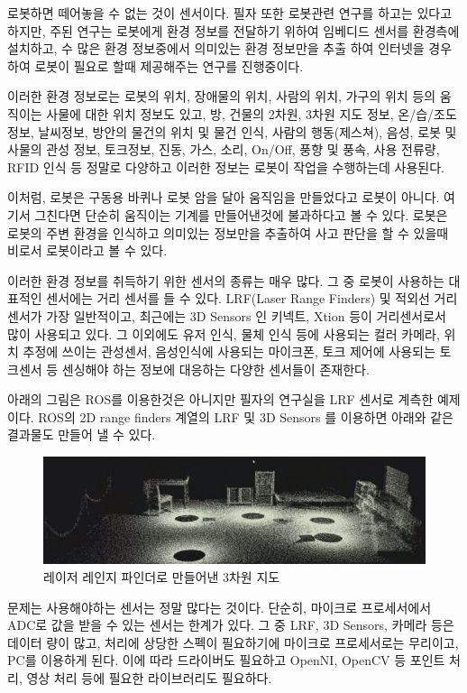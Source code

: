 로봇하면 떼어놓을 수 없는 것이 센서이다. 필자 또한 로봇관련 연구를 하고는 있다고 하지만, 주된 연구는 로봇에게 환경 정보를 전달하기 위하여 임베디드 센서를 환경측에 설치하고, 수 많은 환경 정보중에서 의미있는 환경 정보만을 추출 하여 인터넷을 경우하여 로봇이 필요로 할때 제공해주는 연구를 진행중이다. 

이러한 환경 정보로는 로봇의 위치, 장애물의 위치, 사람의 위치, 가구의 위치 등의 움직이는 사물에 대한 위치 정보도 있고, 방, 건물의 2차원, 3차원 지도 정보, 온/습/조도 정보, 날씨정보, 방안의 물건의 위치 및 물건 인식, 사람의 행동(제스쳐), 음성, 로봇 및 사물의 관성 정보, 토크정보, 진동, 가스, 소리, On/Off, 풍향 및 풍속, 사용 전류량, RFID 인식 등 정말로 다양하고 이러한 정보는 로봇이 작업을 수행하는데 사용된다.

이처럼, 로봇은 구동용 바퀴나 로봇 암을 달아 움직임을 만들었다고 로봇이 아니다. 여기서 그친다면 단순히 움직이는 기계를 만들어낸것에 불과하다고 볼 수 있다. 로봇은 로봇의 주변 환경을 인식하고 의미있는 정보만을 추출하여 사고 판단을 할 수 있을때 비로서 로봇이라고 볼 수 있다. 

이러한 환경 정보를 취득하기 위한 센서의 종류는 매우 많다. 그 중 로봇이 사용하는 대표적인 센서에는 거리 센서를 들 수 있다. LRF(Laser Range Finders) 및 적외선 거리센서가 가장 일반적이고, 최근에는 3D Sensors 인 키넥트, Xtion 등이 거리센서로서 많이 사용되고 있다. 그 이외에도 유저 인식, 물체 인식 등에 사용되는 컬러 카메라, 위치 추정에 쓰이는 관성센서, 음성인식에 사용되는 마이크폰, 토크 제어에 사용되는 토크센서 등 센싱해야 하는 정보에 대응하는 다양한 센서들이 존재한다.

아래의 그림은 ROS를 이용한것은 아니지만 필자의 연구실을 LRF 센서로 계측한 예제이다. ROS의 2D range finders 계열의 LRF 및 3D Sensors 를 이용하면 아래와 같은 결과물도 만들어 낼 수 있다.

\begin{figure}[h]
\centering\includegraphics[width=\columnwidth]{pictures/chapter8/lrf360.png}
\caption{레이저 레인지 파인더로 만들어낸 3차원 지도}
\end{figure}

문제는 사용해야하는 센서는 정말 많다는 것이다. 단순히, 마이크로 프로세서에서 ADC로 값을 받을 수 있는 센서는 한계가 있다. 그 중 LRF, 3D Sensors, 카메라 등은 데이터 량이 많고, 처리에 상당한 스펙이 필요하기에 마이크로 프로세서로는 무리이고, PC를 이용하게 된다. 이에 따라 드라이버도 필요하고 OpenNI, OpenCV 등 포인트 처리, 영상 처리 등에 필요한 라이브러리도 필요하다.

